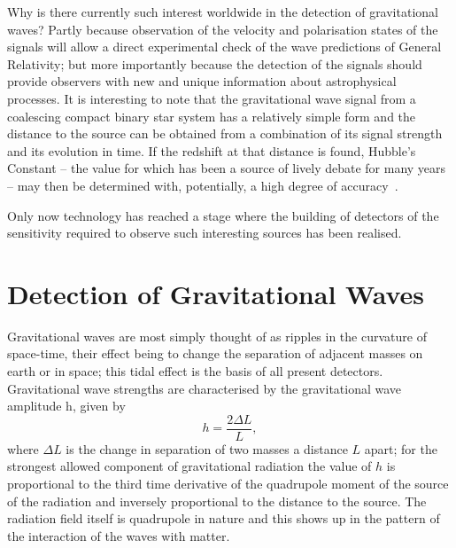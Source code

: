 \documentclass{article}
\begin{document}
Why is there currently such interest worldwide in the detection of gravitational
waves? Partly because observation of the velocity and polarisation states of the
signals will allow a direct experimental check of the wave predictions of
General Relativity; but more importantly because the detection of the signals
should provide observers with new and unique information about astrophysical
processes. It is interesting to note that the gravitational wave signal from a
coalescing compact binary star system has a relatively simple form and the
distance to the source can be obtained from a combination of its signal strength
and its evolution in time. If the redshift at that distance is found, Hubble's
Constant -- the value for which has been a source of lively debate for many
years -- may then be determined with, potentially, a high degree of
accuracy~\cite{Schutz,Holtz:2005}.

Only now technology has reached a stage where the building of detectors of the
sensitivity required to observe such interesting sources has been realised.


\newpage

\section{Detection of Gravitational Waves}
\label{section:Detection}

Gravitational waves are most simply thought of as ripples in the curvature of
space-time, their effect being to change the separation of adjacent masses on
earth or in space; this tidal effect is the basis of all present detectors.
Gravitational wave strengths are characterised by the gravitational wave
amplitude h, given by
%
\begin{equation}
  h = \frac{2 \Delta L} L,
  \label{equation:h}
\end{equation}
%
where $\Delta L$ is the change in separation of two masses a distance $L$ apart;
for the strongest allowed component of gravitational radiation the value of $h$
is proportional to the third time derivative of the quadrupole moment of the
source of the radiation and inversely proportional to the distance to the
source. The radiation field itself is quadrupole in nature and this shows up in
the pattern of the interaction of the waves with matter.
\end{document}
